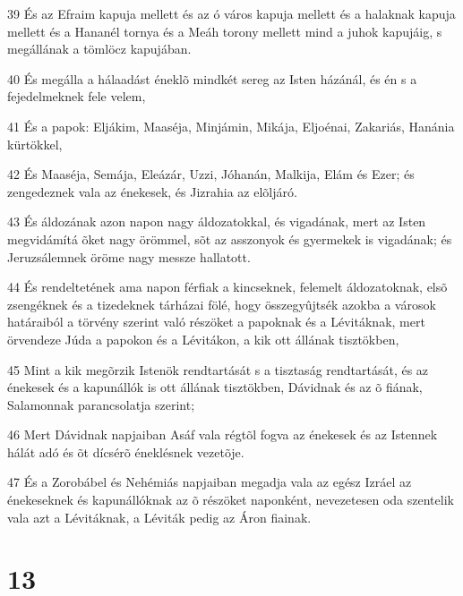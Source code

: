 \par 39 És az Efraim kapuja mellett és az ó város kapuja mellett és a halaknak kapuja mellett és a Hananél tornya és a Meáh torony mellett mind a juhok kapujáig, s megállának a tömlöcz kapujában.
\par 40 És megálla a hálaadást éneklõ mindkét sereg az Isten házánál, és én s a fejedelmeknek fele velem,
\par 41 És a papok: Eljákim, Maaséja, Minjámin, Mikája, Eljoénai, Zakariás, Hanánia kürtökkel,
\par 42 És Maaséja, Semája, Eleázár, Uzzi, Jóhanán, Malkija, Elám és Ezer; és zengedeznek vala az énekesek, és Jizrahia az elõljáró.
\par 43 És áldozának azon napon nagy áldozatokkal, és vigadának, mert az Isten megvidámítá õket nagy örömmel, sõt az asszonyok és gyermekek is vigadának; és Jeruzsálemnek öröme nagy messze hallatott.
\par 44 És rendeltetének ama napon férfiak a kincseknek, felemelt áldozatoknak, elsõ zsengéknek és a tizedeknek tárházai fölé, hogy összegyûjtsék azokba a városok határaiból a törvény szerint való részöket a papoknak és a Lévitáknak, mert örvendeze Júda a papokon és a Lévitákon, a kik ott állának tisztökben,
\par 45 Mint a kik megõrzik Istenök rendtartását s a tisztaság rendtartását, és az énekesek és a kapunállók is ott állának tisztökben, Dávidnak és az õ fiának, Salamonnak parancsolatja szerint;
\par 46 Mert Dávidnak napjaiban Asáf vala régtõl fogva az énekesek és az Istennek hálát adó és õt dícsérõ éneklésnek vezetõje.
\par 47 És a Zorobábel és Nehémiás napjaiban megadja vala az egész Izráel az énekeseknek és kapunállóknak az õ részöket naponként, nevezetesen oda szentelik vala azt a Lévitáknak, a Léviták pedig az Áron fiainak.

\chapter{13}

